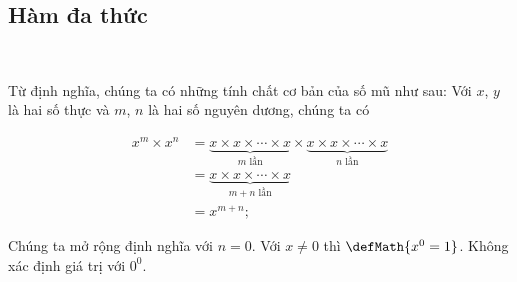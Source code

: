 \subsection{Hàm đa thức}

\ %

Từ định nghĩa, chúng ta có những tính chất cơ bản của số mũ như sau: Với $x$, $y$ là hai số thực và $m$, $n$ là hai số nguyên dương, chúng ta có

\begin{align*}
   x^m \times x^n &= \underbrace{x \times x \times \cdots \times x}_{m\text{ lần}} \times \underbrace{x \times x \times \cdots \times x}_{n\text{ lần}}\\
   &= \underbrace{x \times x \times \cdots \times x}_{m + n\text{ lần}} \\
   &= x^{m+n}; 
\end{align*}

Chúng ta mở rộng định nghĩa với $n = 0$. Với $x \neq 0$ thì $\defMath{x^0 = 1}$. Không xác định giá trị với $0^0$.

